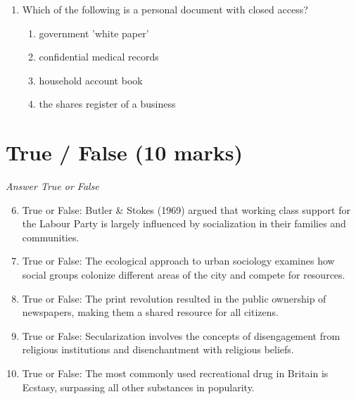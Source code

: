 \documentclass[12pt]{article}
\begin{document}
\begin{enumerate}[label=\arabic*.]
\begin{enumerate}[label=(\alph*)]
    \item shared working conditions in the manufacturing industry
    \item the class consciousness of members of the proletariat
    \item local communities, extended kinship networks and shared leisure pursuits
    \item collective aspirations to move into the middle class
\end{enumerate}
\item Which of the following is a personal document with closed access?
\begin{enumerate}[label=(\alph*)]
    \item government 'white paper'
    \item confidential medical records
    \item household account book
    \item the shares register of a business
\end{enumerate}
\end{enumerate}

\section*{True / False (10 marks)}
\textit{Answer True or False}
\begin{enumerate}[label=\arabic*.]
\setcounter{enumi}{5}
\item True or False: Butler \& Stokes (1969) argued that working class support for the Labour Party is largely influenced by socialization in their families and communities.
\item True or False: The ecological approach to urban sociology examines how social groups colonize different areas of the city and compete for resources.
\item True or False: The print revolution resulted in the public ownership of newspapers, making them a shared resource for all citizens.
\item True or False: Secularization involves the concepts of disengagement from religious institutions and disenchantment with religious beliefs.
\item True or False: The most commonly used recreational drug in Britain is Ecstasy, surpassing all other substances in popularity.
\end{enumerate}
\end{document}
